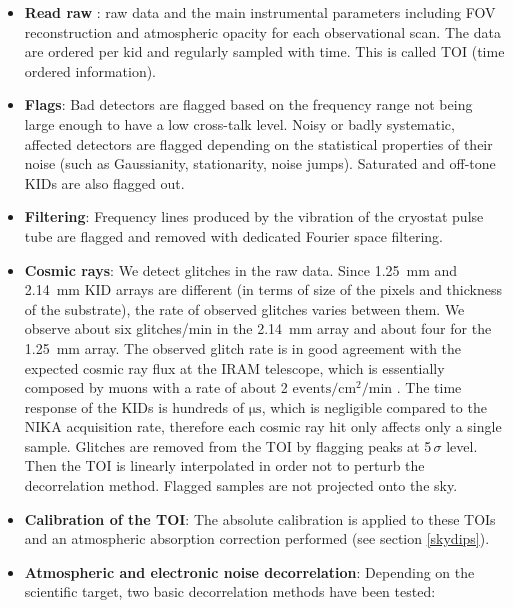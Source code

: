 \begin{itemize}

\item {\bfseries Read raw} : raw data and the main instrumental parameters
including FOV reconstruction and atmospheric
opacity for each observational scan. The data are ordered per kid and
regularly sampled with time. This is called TOI (time ordered information).

\item {\bfseries Flags}: Bad detectors are flagged based on the
  frequency range not being large enough to have a low cross-talk level. 
  Noisy or badly systematic, affected detectors are flagged depending on the statistical 
  properties of their noise (such as Gaussianity, stationarity, noise jumps). 
  Saturated and off-tone KIDs are also flagged out.

 \item {\bfseries Filtering}: Frequency lines produced
  by the vibration of the cryostat pulse tube are flagged and removed with
  dedicated Fourier space filtering.

\item {\bfseries Cosmic rays}: We detect glitches in the raw data. Since
  1.25~mm and 2.14~mm KID arrays are different (in terms of size of the
  pixels and thickness of the substrate), the rate of observed glitches varies
  between them. We observe about six glitches/min in the 2.14~mm array
  and about four for the 1.25~mm array. The observed glitch rate is in
  good agreement with the expected cosmic ray flux at the IRAM telescope,
  which is essentially composed by muons with a rate of about 2 $\mathrm{events / cm^2 /
    min}$ \cite{Ramesh2012}. The time response of the KIDs is hundreds of
  $\mathrm{\mu s}$, which is negligible compared to the NIKA acquisition rate,
  therefore each cosmic ray hit only affects only a single sample. Glitches
  are removed from the TOI by flagging peaks at 5\,$\sigma$ level. Then the
  TOI is linearly interpolated in order not to perturb the decorrelation
  method. Flagged samples are not projected onto the sky.

\item {\bfseries Calibration of the TOI}: The absolute calibration is applied
  to these TOIs and an atmospheric absorption correction performed (see section
  \ref{skydips}).

\item {\bfseries Atmospheric and electronic noise decorrelation}: Depending
  on the scientific target, two basic decorrelation methods have been
  tested:


\end{itemize}
